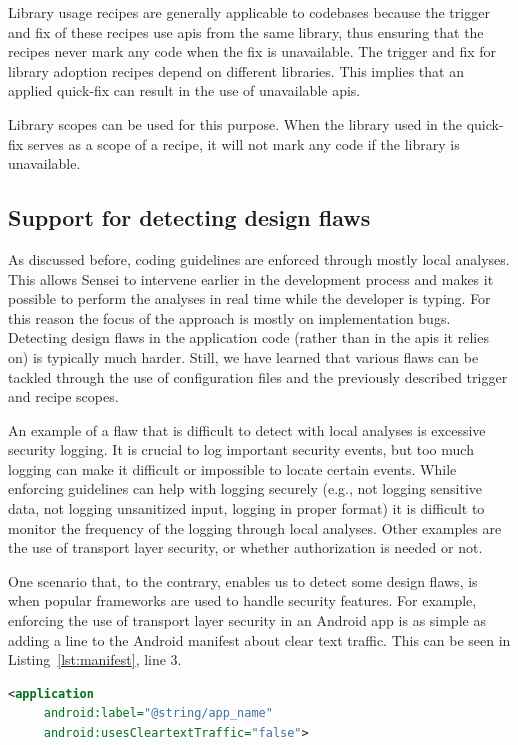 Library usage recipes are generally applicable to codebases because the trigger and fix of these recipes use \glspl{api} from the same library, thus ensuring that the recipes never mark any code when the fix is unavailable.
The trigger and fix for library adoption recipes depend on different libraries.
This implies that an applied quick-fix can result in the use of unavailable \glspl{api}. 

Library scopes can be used for this purpose.
When the library used in the quick-fix serves as a scope of a recipe, it will not mark any code if the library is unavailable.

\subsection{Support for detecting design flaws}
As discussed before, coding guidelines are enforced through mostly local analyses.
This allows Sensei to intervene earlier in the development process and makes it possible to perform the analyses in real time while the developer is typing.
For this reason the focus of the approach is mostly on implementation bugs.
Detecting design flaws in the application code (rather than in the \glspl{api} it relies on) is typically much harder.
Still, we have learned that various flaws can be tackled through the use of configuration files and the previously described trigger and recipe scopes.

An example of a flaw that is difficult to detect with local analyses is excessive security logging.
It is crucial to log important security events, but too much logging can make it difficult or impossible to locate certain events.
While enforcing guidelines can help with logging securely (e.g., not logging sensitive data, not logging unsanitized input, logging in proper format) it is difficult to monitor the frequency of the logging through local analyses.
Other examples are the use of transport layer security, or whether authorization is needed or not.

One scenario that, to the contrary, enables us to detect some design flaws, is when popular frameworks are used to handle security features.
For example, enforcing the use of transport layer security in an Android app is as simple as adding a line to the Android manifest about clear text traffic.
This can be seen in Listing~\ref{lst:manifest}, line 3.

\begin{lstlisting}[language={XML},caption={When the attribute \texttt{usesCleartextTraffic} is added to the Android manifest with value \texttt{false}, the Android \gls{os} will ensure that transport layer security is used for the communication with this application.},float,label={lst:manifest},abovecaptionskip=-0.5pt]
<application
     android:label="@string/app_name"
     android:usesCleartextTraffic="false">
\end{lstlisting}

